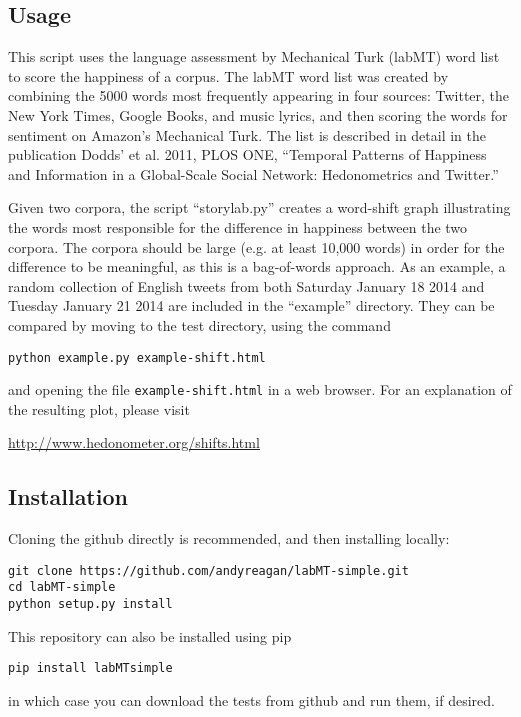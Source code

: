 \subsection{Usage}
\label{getting-started:usage}
This script uses the language assessment by Mechanical Turk (labMT) word list to score the happiness of a corpus. The labMT word list was created by combining the 5000 words most frequently appearing in four sources: Twitter, the New York Times, Google Books, and music lyrics, and then scoring the words for sentiment on Amazon's Mechanical Turk. The list is described in detail in the publication Dodds' et al. 2011, PLOS ONE, ``Temporal Patterns of Happiness and Information in a Global-Scale Social Network: Hedonometrics and Twitter.''

Given two corpora, the script ``storylab.py'' creates a word-shift graph illustrating the words most responsible for the difference in happiness between the two corpora. The corpora should be large (e.g. at least 10,000 words) in order for the difference to be meaningful, as this is a bag-of-words approach. As an example, a random collection of English tweets from both Saturday January 18 2014 and Tuesday January 21 2014 are included in the ``example'' directory. They can be compared by moving to the test directory, using the command
\begin{lstlisting}
python example.py example-shift.html
\end{lstlisting}

and opening the file \lstinline{example-shift.html} in a web browser. For an explanation of the resulting plot, please visit

\href{http://www.hedonometer.org/shifts.html}{http://www.hedonometer.org/shifts.html}


\subsection{Installation}
\label{getting-started:installation}
Cloning the github directly is recommended, and then installing locally:
\begin{lstlisting}
git clone https://github.com/andyreagan/labMT-simple.git
cd labMT-simple
python setup.py install
\end{lstlisting}

This repository can also be installed using pip
\begin{lstlisting}
pip install labMTsimple
\end{lstlisting}

in which case you can download the tests from github and run them, if desired.


